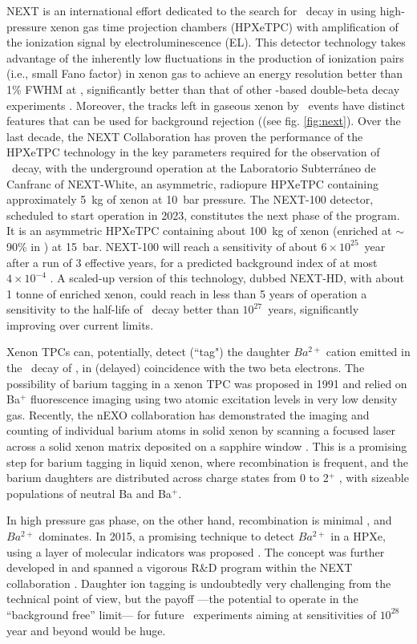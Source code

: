  
NEXT \cite{NEXT:2015wlq, NEXT:2020amj} is an international effort dedicated to the search for \bbonu\ decay in  using high-pressure xenon gas time projection chambers (HPXeTPC) with amplification of the ionization signal by electroluminescence (EL). This detector technology takes advantage of the inherently low fluctuations in the production of ionization pairs (i.e., small Fano factor) in xenon gas to achieve an energy resolution better than 1\% FWHM at \Qbb, significantly better than that of other -based double-beta decay experiments \cite{Nygren:2009zz}. Moreover, the tracks left in gaseous xenon by \bbonu\ events have distinct features that can be used for background rejection ((see fig. \ref{fig:next}). Over the last decade, the NEXT Collaboration has proven the performance of the HPXeTPC technology in the key parameters required for the observation of \bbonu\ decay, with the underground operation at the Laboratorio Subterr\'aneo de Canfranc of NEXT-{\sc White}, an asymmetric, radiopure HPXeTPC containing approximately 5~kg of xenon at 10~bar pressure. 
The NEXT-100 detector, scheduled to start operation in 2023, constitutes the next phase of the program. It is an asymmetric HPXeTPC containing about 100~kg of xenon (enriched at $\sim$90\% in ) at 15~bar. NEXT-100 will reach a sensitivity of about $6\times10^{25}$~year after a run of 3 effective years, for a predicted background index of at most $4\times10^{-4}$ \ckky. A scaled-up version of this technology, dubbed NEXT-HD, with about 1 tonne of enriched xenon, could reach in less than 5 years of operation a sensitivity to the half-life of \bbonu\ decay better than $10^{27}$~years, significantly improving over current limits. 

Xenon TPCs can, potentially, detect (``tag") the daughter $Ba^{2+}$ cation emitted in the \bbonu\ decay of , in (delayed) coincidence with the two beta electrons. 
The possibility of barium tagging in a xenon TPC was proposed in 1991\cite{Moe:1991ik} and relied on Ba$^+$ fluorescence imaging using two atomic excitation levels in very low density gas. Recently,
the nEXO collaboration has demonstrated the imaging and counting of individual barium atoms in solid xenon by scanning a focused laser across a solid xenon matrix deposited on a sapphire window \cite{nEXO:2018nxx}. This is a promising step for barium tagging in liquid xenon, where recombination is frequent, and the barium daughters are distributed across charge states from 0 to 2$^+$ \cite{PhysRevC.92.045504}, with sizeable populations of neutral Ba and  Ba$^+$.  

In high pressure gas phase, on the other hand, recombination is minimal \cite{1997NIMPA.396..360B}, and $Ba^{2+}$ dominates. In 2015, a promising technique to detect $Ba^{2+}$ in a HPXe, using a layer of molecular indicators was
proposed \cite{Nygren:2015xxi}. The concept was further developed in \cite{Jones:2016qiq} and spanned a vigorous R\&D program within the NEXT collaboration \cite{McDonald:2017izm,Rivilla:2020cvm}. 
Daughter ion tagging is undoubtedly very challenging from the technical point of view, but the payoff ---the potential to operate in the ``background free'' limit--- for future \bbonu\ experiments aiming at sensitivities of $10^{28}$ year and beyond  would be huge.